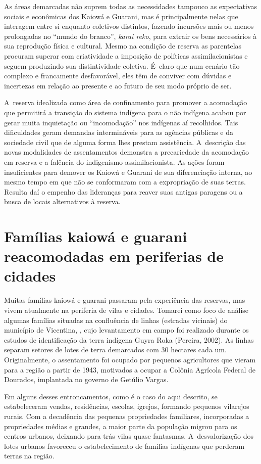 As áreas demarcadas não suprem todas as necessidades tampouco as
expectativas sociais e econômicas dos Kaiowá e Guarani, mas é
principalmente nelas que interagem entre si enquanto coletivos
distintos, fazendo incursões mais ou menos prolongadas no ``mundo do
branco'', \emph{karai reko}, para extrair os bens necessários à sua reprodução
física e cultural. Mesmo na condição de reserva as parentelas procuram
superar com criatividade a imposição de políticas assimilacionistas e
seguem produzindo sua distintividade coletiva. É~claro que num cenário
tão complexo e francamente desfavorável, eles têm de conviver com
dúvidas e incertezas em relação ao presente e ao futuro de seu modo
próprio de ser. 

A~reserva idealizada como área de confinamento para promover a
acomodação que permitirá a transição do sistema indígena para o não
indígena acabou por gerar muita inquietação ou ``incomodação'' nos
indígenas aí recolhidos. Tais dificuldades geram demandas intermináveis
para as agências públicas e da sociedade civil que de alguma forma lhes
prestam assistência. A~descrição das novas modalidades de assentamentos
demonstra a precariedade da acomodação em reserva e a falência do
indigenismo assimilacionista. As ações foram insuficientes para demover
os Kaiowá e Guarani de sua diferenciação interna, ao mesmo tempo em que
não se conformaram com a expropriação de suas terras. Resulta daí o
empenho das lideranças para reaver suas antigas paragens ou a busca de
locais alternativos à reserva.

\section{Famílias kaiowá e guarani reacomodadas em periferias de cidades}

Muitas famílias kaiowá e guarani passaram pela experiência das reservas,
mas vivem atualmente na periferia de vilas e cidades. Tomarei como foco
de análise algumas famílias situadas na confluência de linhas (estradas
vicinais) do município de Vicentina, , cujo levantamento em campo foi
realizado durante os estudos de identificação da terra indígena Guyra
Roka (Pereira, 2002). As linhas separam setores de lotes de terra
demarcados com 30 hectares cada um. Originalmente, o assentamento foi
ocupado por pequenos agricultores que vieram para a região a partir de
1943, motivados a ocupar a Colônia Agrícola Federal de Dourados,
implantada no governo de Getúlio Vargas.

Em alguns desses entroncamentos, como é o caso do aqui descrito, se
estabeleceram vendas, residências, escolas, igrejas, formando pequenos
vilarejos rurais. Com a decadência das pequenas propriedades
familiares, incorporadas a propriedades médias e grandes, a maior parte
da população migrou para os centros urbanos, deixando para trás vilas
quase fantasmas. A~desvalorização dos lotes urbanos favoreceu o
estabelecimento de famílias indígenas que perderam terras na região.

